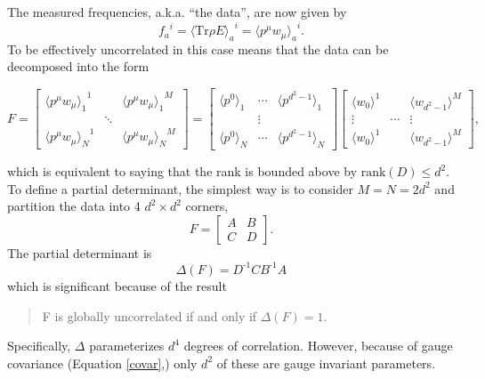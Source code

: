 \documentclass[pra, 10pt, notitlepage, twocolumn]{revtex4-1}
\newcommand{\Tr}{\mathrm{Tr}}
\newcommand{\inv}{\text{-1}}
\newcommand{\rank}{\mathrm{rank}}
\begin{document}
The measured frequencies, a.k.a. ``the data'',  are now given by
\begin{equation}
	{f_a}^i = {\langle \Tr \rho E\rangle_a}^i = {\langle p^\mu w_\mu \rangle_a}^i.
\end{equation}
To be effectively uncorrelated in this case means that the data can be decomposed into the form
\begin{widetext}

\begin{equation}\label{quanteff}
F=
\left[
\begin{array}{ccc}
	{\langle p^\mu w_\mu \rangle_1}^1	&&	{\langle p^\mu w_\mu \rangle_1}^M	\\
		&	\ddots	&	\\
	{\langle p^\mu w_\mu \rangle_N}^1	&&	{\langle p^\mu w_\mu \rangle_N}^M	
\end{array}
\right]
=
\left[
\begin{array}{ccc}
	\langle p^0 \rangle_1 & \cdots & \langle p^{d^2-1} \rangle_1	\\
	&\vdots&	\\
	\langle p^0 \rangle_N & \cdots & \langle p^{d^2-1} \rangle_N	
\end{array}
\right]
\left[
\begin{array}{ccc}
	\langle w_0 \rangle^1	& &	\langle w_{d^2-1} \rangle^M\\
	\vdots&\cdots&\vdots\\
	\langle w_0 \rangle^1	& &	\langle w_{d^2-1} \rangle^M
\end{array}
\right],
\end{equation}

\end{widetext}
which is equivalent to saying that the rank is bounded above by $\rank(D) \le d^2$.
To define a partial determinant, the simplest way is to consider $M=N=2d^2$ and partition the data into 4 $d^2\!\times\!d^2$ corners,
\begin{equation}\label{corners}
F=
\left[
\begin{array}{cc}
	A & B \\
	C & D
\end{array}
\right].
\end{equation}
The partial determinant is
\begin{equation}\label{QPD}
	\Delta(F) = D^\inv C B^\inv A
\end{equation}
which is significant because of the result
\begin{verse}\centering
	F is globally uncorrelated if and only if $\Delta(F)=1$.
\end{verse}
Specifically, $\Delta$ parameterizes $d^4$ degrees of correlation.
However, because of gauge covariance (Equation \ref{covar},) only $d^2$ of these are gauge invariant parameters.
\end{document}
